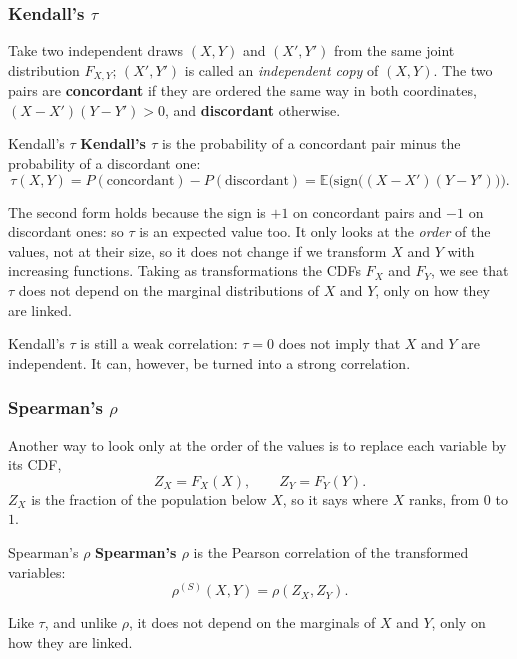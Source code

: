 \documentclass[a4paper,12pt,oneside]{report}
\begin{document}
\subsubsection{Kendall's \texorpdfstring{$\tau$}{tau}}

Take two independent draws $(X,Y)$ and $(X',Y')$ from the same joint
distribution $F_{X,Y}$; $(X',Y')$ is called an \emph{independent copy} of
$(X,Y)$. The two pairs are \textbf{concordant} if they are ordered the
same way in both coordinates, $(X-X')(Y-Y')>0$, and \textbf{discordant}
otherwise.

\begin{frameddefn}{Kendall's $\tau$}\label{def:kendall}
\textbf{Kendall's $\tau$} is the probability of a concordant pair minus
the probability of a discordant one:
\[
\tau(X,Y)=P(\text{concordant})-P(\text{discordant})
=\mathbb{E}\Big(\mathrm{sign}\big((X-X')(Y-Y')\big)\Big).
\]
\end{frameddefn}

The second form holds because the sign is $+1$ on concordant pairs and
$-1$ on discordant ones: so $\tau$ is an expected value too. It only looks
at the \emph{order} of the values, not at their size, so it does not
change if we transform $X$ and $Y$ with increasing functions. Taking as
transformations the CDFs $F_X$ and $F_Y$, we see that $\tau$ does not
depend on the marginal distributions of $X$ and $Y$, only on how they are
linked.

Kendall's $\tau$ is still a weak correlation: $\tau=0$ does not imply
that $X$ and $Y$ are independent. It can, however, be turned into a strong
correlation.

\subsubsection{Spearman's \texorpdfstring{$\rho$}{rho}}

Another way to look only at the order of the values is to replace each
variable by its CDF,
\[
Z_X=F_X(X),\qquad Z_Y=F_Y(Y).
\]
$Z_X$ is the fraction of the population below $X$, so it says where $X$
ranks, from $0$ to $1$.

\begin{frameddefn}{Spearman's $\rho$}\label{def:spearman}
\textbf{Spearman's $\rho$} is the Pearson correlation of the transformed
variables:
\[
\rho^{(S)}(X,Y)=\rho(Z_X,Z_Y).
\]
\end{frameddefn}

Like $\tau$, and unlike $\rho$, it does not depend on the marginals of $X$
and $Y$, only on how they are linked.
\end{document}
